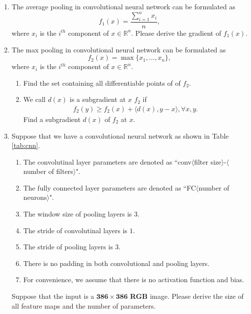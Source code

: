\documentclass[11pt,letter,notitlepage]{article}
\begin{document}
\begin{exercise}
\begin{enumerate}
    \item The average pooling in convolutional neural network can be formulated as 
    $$f_1(x)= \frac{\sum_{i=1}^n x_i}{n},$$
    where $x_i$ is the $i^{th}$ component of $x\in\mathbb{R}^n$. Please derive the gradient of $f_1(x)$.
    \item The max pooling in convolutional neural network can be formulated as 
    $$f_2(x)= \max\{x_1,\dots,x_n\},$$
    where $x_i$ is the $i^{th}$ component of $x\in\mathbb{R}^n$.
    \begin{enumerate}
        \item Find the set containing all differentiable points of of $f_2$.
        \item We call $d(x)$ is a subgradient at $x$ $f_2$ if
        \begin{align*}
            f_2(y) \geq f_2(x) + \langle d(x),y-x \rangle, \forall x,y .
        \end{align*}
        Find a subgradient $d(x)$ of $f_2$ at $x$.
    \end{enumerate}
    \item Suppose that we have a convolutional neural network as shown in Table \ref{tab:cnn}. 
	\begin{enumerate}
		\item The convolutinal layer parameters are denoted as ``conv$\langle$filter size$\rangle$-$\langle$number of filters$\rangle$".
		\item  The fully connected layer parameters are denoted as ``FC$\langle$number of neurons$\rangle$".
		\item The window size of pooling layers is $3$. 
		\item The stride of convolutinal layers is $1$. 
		\item The stride of pooling layers is $3$. 
		\item There is no padding in both convolutional and pooling layers.
		\item For convenience, we assume that there is no activation function and bias.
	\end{enumerate} 
	
	Suppose that the input is a $\mathbf{386\times 386}$ \textbf{RGB} image. Please derive the size of all feature maps and the number of parameters.
\end{enumerate}
	
	
\end{exercise}
\end{document}
